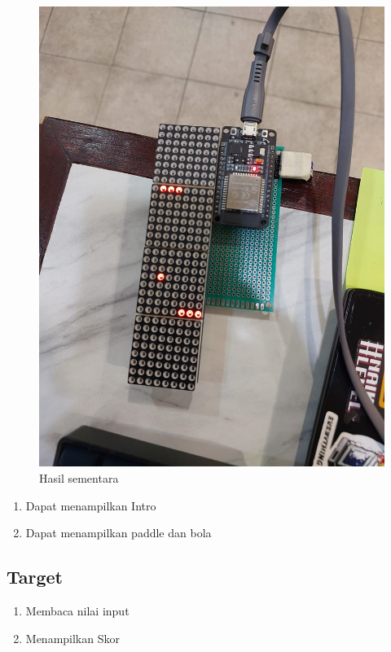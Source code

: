 \documentclass[a4paper,12pt]{article}
\begin{document}
\begin{figure}[h!]
    \centering
    \includegraphics[width=1\textwidth]{images/item.jpeg}
    \caption{Hasil sementara}
\end{figure}
\begin{enumerate}
    \item Dapat menampilkan Intro
    \item Dapat menampilkan paddle dan bola
\end{enumerate}
\subsection{Target}
\begin{enumerate}
    \item Membaca nilai input
    \item Menampilkan Skor
\end{enumerate}
\end{document}

